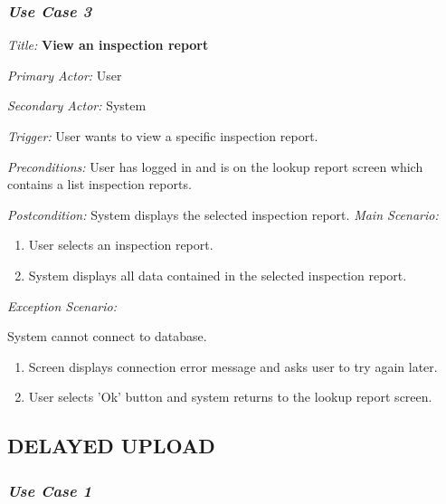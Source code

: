 \documentclass[twoside,letterpaper]{article}
\begin{document}
\subsubsection{\textit{Use Case 3}}

\textit{Title: }{\bfseries\color{black}View an inspection report}

{\color{black} \textit{Primary Actor:} User}

{\color{black} \textit{Secondary Actor:} System}

{\color{black} \textit{Trigger:} User wants to view a specific inspection report.}

{\color{black} \textit{Preconditions:} User has logged in and is on the lookup report screen which contains a list inspection reports.}

{\color{black} \textit{Postcondition:} System displays the selected inspection report.}
\newline
{\color{black} \textit{Main Scenario:}}\
\begin{enumerate}
\item User selects an inspection report.
\item System displays all data contained in the selected inspection report.
\end{enumerate}
{\color{black} \textit{Exception Scenario:}}

\begin{description}
\item System cannot connect to database.
\begin{enumerate}
\item Screen displays connection error message and asks user to try again later.
\item User selects 'Ok' button and system returns to the lookup report screen.
\end{enumerate}
\end{description}

\subsection[DELAYED UPLOAD]
{\rmfamily\bfseries\color{black}
DELAYED UPLOAD}
\subsubsection{\textit{Use Case 1}}
\end{document}
